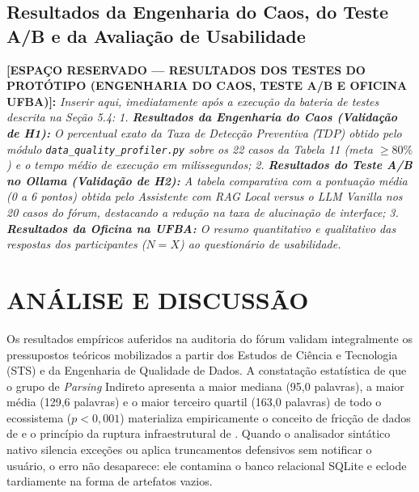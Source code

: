\documentclass[
	oneside,
	a4paper,
	12pt,
	chapter=TITLE,
	section=TITLE,
	english,
	brazilian
]{abntex2}
\begin{document}
\FloatBarrier
\subsection{Resultados da Engenharia do Caos, do Teste A/B e da Avaliação de Usabilidade}\label{sec:resultados_da_engenharia_do_caos_do_test}


\begin{citacao}
\textbf{[ESPAÇO RESERVADO — RESULTADOS DOS TESTES DO PROTÓTIPO (ENGENHARIA DO CAOS, TESTE A/B E OFICINA UFBA)]:} \textit{Inserir aqui, imediatamente após a execução da bateria de testes descrita na Seção 5.4:} \textit{1. \textbf{Resultados da Engenharia do Caos (Validação de H1):} O percentual exato da Taxa de Detecção Preventiva ($TDP$) obtido pelo módulo \texttt{data\_\allowbreak quality\_\allowbreak profiler.\allowbreak py} sobre os 22 casos da Tabela 11 (meta $\ge 80\%$) e o tempo médio de execução em milissegundos;} \textit{2. \textbf{Resultados do Teste A/B no Ollama (Validação de H2):} A tabela comparativa com a pontuação média (0 a 6 pontos) obtida pelo Assistente com RAG Local versus o LLM Vanilla nos 20 casos do fórum, destacando a redução na taxa de alucinação de interface;} \textit{3. \textbf{Resultados da Oficina na UFBA:} O resumo quantitativo e qualitativo das respostas dos participantes ($N = X$) ao questionário de usabilidade.}
\end{citacao}


\FloatBarrier
\section{ANÁLISE E DISCUSSÃO}\label{sec:analise_e_discussao}


Os resultados empíricos auferidos na auditoria do fórum validam integralmente os pressupostos teóricos mobilizados a partir dos Estudos de Ciência e Tecnologia (STS) e da Engenharia de Qualidade de Dados. A constatação estatística de que o grupo de \textit{Parsing} Indireto apresenta a maior mediana (95,0 palavras), a maior média (129,6 palavras) e o maior terceiro quartil (163,0 palavras) de todo o ecossistema ($p < 0,001$) \cite{Kruskal1952} materializa empiricamente o conceito de fricção de dados de  e o princípio da ruptura infraestrutural de . Quando o analisador sintático nativo silencia exceções ou aplica truncamentos defensivos sem notificar o usuário, o erro não desaparece: ele contamina o banco relacional SQLite e eclode tardiamente na forma de artefatos vazios.
\end{document}
